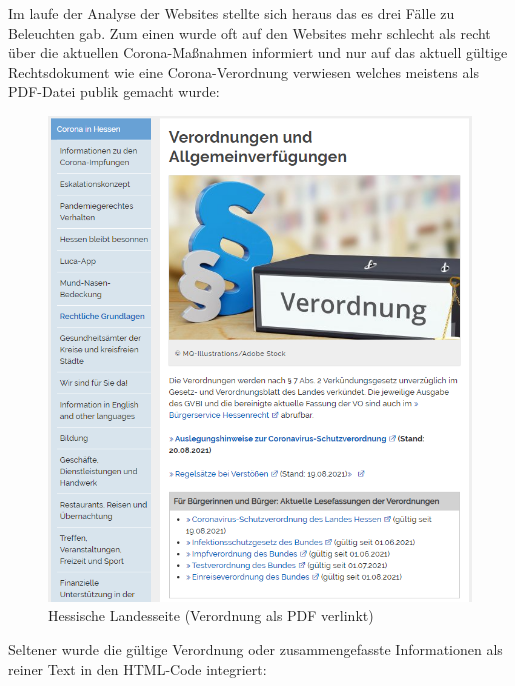 \documentclass[12pt,oneside,a4paper,parskip]{scrbook}
\begin{document}
Im laufe der Analyse der Websites stellte sich heraus das es drei Fälle zu Beleuchten gab. Zum einen wurde oft auf den Websites mehr schlecht als recht über die aktuellen Corona-Maßnahmen informiert und nur auf das aktuell gültige Rechtsdokument wie eine Corona-Verordnung verwiesen welches meistens als PDF-Datei publik gemacht wurde:
\begin{figure}[H]
\caption{Hessische Landesseite (Verordnung als PDF verlinkt)}
\label{websiteHessen}
\centering
\includegraphics[scale=0.9]{pictures/hessenOverview.png}
\end{figure}

Seltener wurde die gültige Verordnung oder zusammengefasste Informationen als reiner Text in den HTML-Code integriert:
\end{document}
